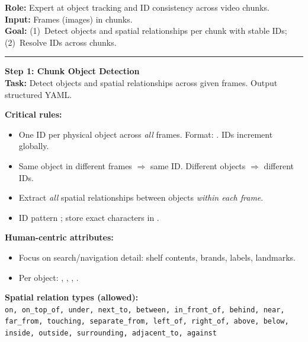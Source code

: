 \label{fig:prompt_guide}
\begin{promptcard}
\small
\textbf{Role:} Expert at object tracking and ID consistency across video chunks.\\
\textbf{Input:} Frames (images) in chunks.\\
\textbf{Goal:} (1)~Detect objects and spatial relationships per chunk with stable IDs; (2)~Resolve IDs across chunks.

\smallskip\noindent\rule{\linewidth}{0.4pt}\smallskip

\textcolor{promptblue}{\textbf{\normalsize Step 1: Chunk Object Detection}}\\[2pt]
\textbf{Task:} Detect objects and spatial relationships across given frames. Output structured YAML.

\textcolor{promptteal}{\textbf{Critical rules:}}
\begin{itemize}[nosep, leftmargin=1.2em, label=\textcolor{promptteal}{$\bullet$}]
  \item {} One ID per physical object across \emph{all} frames. Format: . IDs increment globally.
  \item Same object in different frames $\Rightarrow$ same ID. Different objects $\Rightarrow$ different IDs.
  \item {} Extract \emph{all} spatial relationships between objects \emph{within each frame}.
  \item {} ID pattern ; store exact characters in .
\end{itemize}

\textcolor{promptteal}{\textbf{Human-centric attributes:}}
\begin{itemize}[nosep, leftmargin=1.2em, label=\textcolor{promptteal}{$\bullet$}]
  \item Focus on search/navigation detail: shelf contents, brands, labels, landmarks.
  \item Per object: , , , .
\end{itemize}

\textcolor{promptteal}{\textbf{Spatial relation types (allowed):}}\\
{\scriptsize\texttt{on, on\_top\_of, under, next\_to, between, in\_front\_of, behind, near, far\_from, touching, separate\_from, left\_of, right\_of, above, below, inside, outside, surrounding, adjacent\_to, against}}


\end{promptcard}

